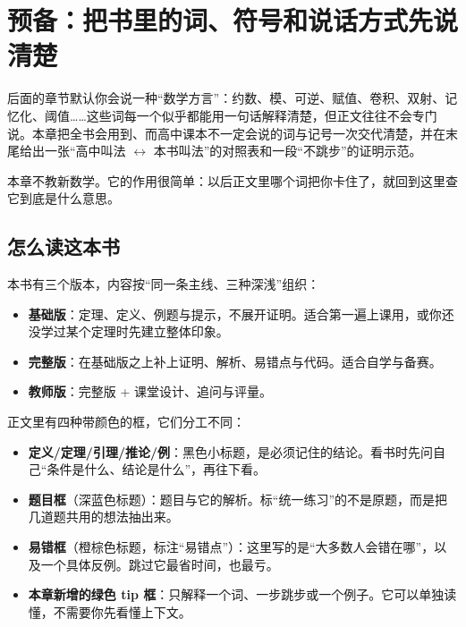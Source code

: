 \documentclass[UTF8,a4paper,11pt,oneside,openany,fontset=fandol]{ctexbook}
\theoremstyle{definition}
\begin{document}


\tableofcontents
\mainmatter
\setcounter{chapter}{-1}
\chapter{预备：把书里的词、符号和说话方式先说清楚}
\begin{tip}[这一章解决什么问题]
后面的章节默认你会说一种“数学方言”：约数、模、可逆、赋值、卷积、双射、记忆化、阈值……这些词每一个似乎都能用一句话解释清楚，但正文往往不会专门说。本章把全书会用到、而高中课本不一定会说的词与记号一次交代清楚，并在末尾给出一张“高中叫法 $\leftrightarrow$ 本书叫法”的对照表和一段“不跳步”的证明示范。

本章不教新数学。它的作用很简单：以后正文里哪个词把你卡住了，就回到这里查它到底是什么意思。
\end{tip}

\section{怎么读这本书}
本书有三个版本，内容按“同一条主线、三种深浅”组织：

\begin{itemize}
\item \textbf{基础版}：定理、定义、例题与提示，不展开证明。适合第一遍上课用，或你还没学过某个定理时先建立整体印象。
\item \textbf{完整版}：在基础版之上补上证明、解析、易错点与代码。适合自学与备赛。
\item \textbf{教师版}：完整版 + 课堂设计、追问与评量。
\end{itemize}

正文里有四种带颜色的框，它们分工不同：

\begin{itemize}
\item \textbf{定义/定理/引理/推论/例}：黑色小标题，是必须记住的结论。看书时先问自己“条件是什么、结论是什么”，再往下看。
\item \textbf{题目框}（深蓝色标题）：题目与它的解析。标“统一练习”的不是原题，而是把几道题共用的想法抽出来。
\item \textbf{易错框}（橙棕色标题，标注“易错点”）：这里写的是“大多数人会错在哪”，以及一个具体反例。跳过它最省时间，也最亏。
\item \textbf{本章新增的绿色 tip 框}：只解释一个词、一步跳步或一个例子。它可以单独读懂，不需要你先看懂上下文。
\end{itemize}
\end{document}
